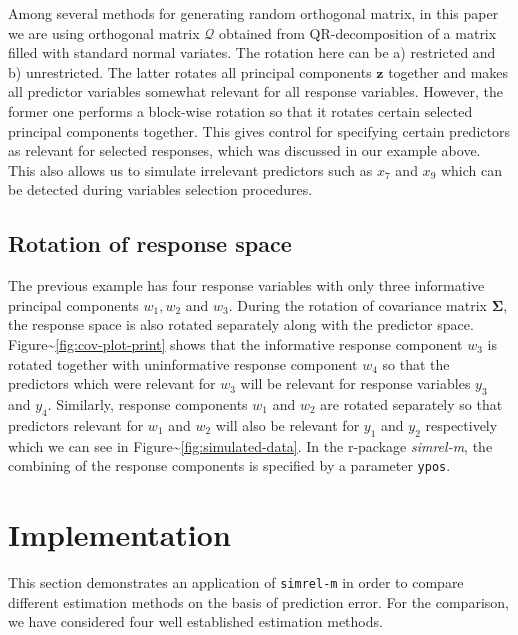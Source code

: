 \documentclass[12pt,A4paper,authoryear]{elsarticle} %
\theoremstyle{definition}
\theoremstyle{definition}
\theoremstyle{remark}
\begin{document}
Among several methods
\citep{anderson1987generation, heiberger1978algorithm} for generating
random orthogonal matrix, in this paper we are using orthogonal matrix
\(\mathcal{Q}\) obtained from QR-decomposition of a matrix filled with
standard normal variates. The rotation here can be a) restricted and b)
unrestricted. The latter rotates all principal components \(\mathbf{z}\)
together and makes all predictor variables somewhat relevant for all
response variables. However, the former one performs a block-wise
rotation so that it rotates certain selected principal components
together. This gives control for specifying certain predictors as
relevant for selected responses, which was discussed in our example
above. This also allows us to simulate irrelevant predictors such as
\(x_{7}\) and \(x_{9}\) which can be detected during variables selection
procedures.

\hypertarget{rotation-of-response-space}{\subsection{Rotation of
response space}\label{rotation-of-response-space}}

The previous example has four response variables with only three
informative principal components \(w_1, w_2\) and \(w_3\). During the
rotation of covariance matrix \(\boldsymbol{\Sigma}\), the response
space is also rotated separately along with the predictor space.
Figure\textasciitilde{}\ref{fig:cov-plot-print} shows that the
informative response component \(w_3\) is rotated together with
uninformative response component \(w_4\) so that the predictors which
were relevant for \(w_3\) will be relevant for response variables
\(y_3\) and \(y_4\). Similarly, response components \(w_1\) and \(w_2\)
are rotated separately so that predictors relevant for \(w_1\) and
\(w_2\) will also be relevant for \(y_1\) and \(y_2\) respectively which
we can see in Figure\textasciitilde{}\ref{fig:simulated-data}. In the
r-package \emph{simrel-m}, the combining of the response components is
specified by a parameter \texttt{ypos}.

\hypertarget{implementation}{\section{Implementation}\label{implementation}}

This section demonstrates an application of \texttt{simrel-m} in order
to compare different estimation methods on the basis of prediction
error. For the comparison, we have considered four well established
estimation methods.
\end{document}
